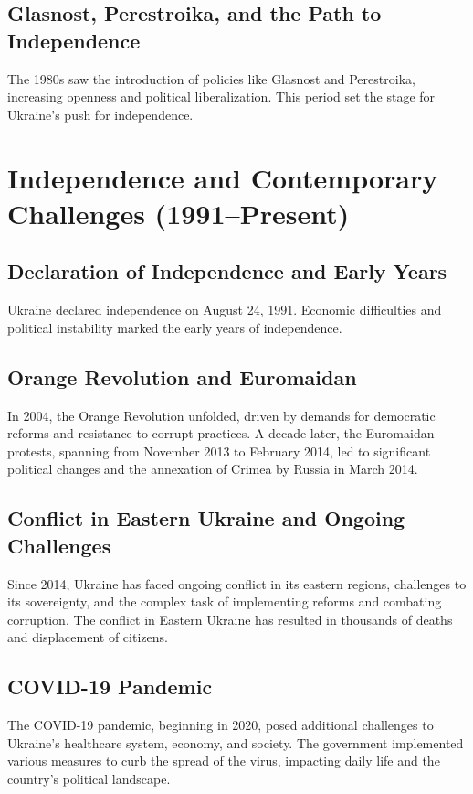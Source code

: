\documentclass{book}
\begin{document}
\subsection{Glasnost, Perestroika, and the Path to Independence}
The 1980s saw the introduction of policies like Glasnost and Perestroika, increasing openness and political liberalization. This period set the stage for Ukraine's push for independence.

\section{Independence and Contemporary Challenges (1991–Present)}
\label{sec:independence-contemporary-challenges}
\subsection{Declaration of Independence and Early Years}
Ukraine declared independence on August 24, 1991. Economic difficulties and political instability marked the early years of independence.

\subsection{Orange Revolution and Euromaidan}
In 2004, the Orange Revolution unfolded, driven by demands for democratic reforms and resistance to corrupt practices. A decade later, the Euromaidan protests, spanning from November 2013 to February 2014, led to significant political changes and the annexation of Crimea by Russia in March 2014.

\subsection{Conflict in Eastern Ukraine and Ongoing Challenges}
Since 2014, Ukraine has faced ongoing conflict in its eastern regions, challenges to its sovereignty, and the complex task of implementing reforms and combating corruption. The conflict in Eastern Ukraine has resulted in thousands of deaths and displacement of citizens.

\subsection{COVID-19 Pandemic}
The COVID-19 pandemic, beginning in 2020, posed additional challenges to Ukraine's healthcare system, economy, and society. The government implemented various measures to curb the spread of the virus, impacting daily life and the country’s political landscape.
\end{document}
